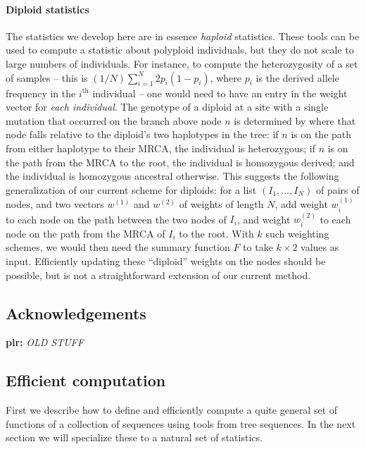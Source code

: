 \documentclass{article}
\newcommand{\plr}[1]{{\color{blue}\textbf{plr:} \it #1}}
\begin{document}
\paragraph{Diploid statistics}
The statistics we develop here are in essence \emph{haploid} statistics.
These tools can be used to compute a statistic about polyploid individuals,
but they do not scale to large numbers of individuals.
For instance, to compute the heterozygosity of a set of samples
-- this is $(1/N) \sum_{i=1}^N 2 p_i (1-p_i)$, where $p_i$ is the derived allele frequency
in the $i^\text{th}$ individual --
one would need to have an entry in the weight vector for \emph{each individual}.
The genotype of a diploid at a site with a single mutation that occurred on the branch above node $n$
is determined by where that node falls relative to the diploid's two haplotypes in the tree:
if $n$ is on the path from either haplotype to their MRCA, the individual is heterozygous;
if $n$ is on the path from the MRCA to the root, the individual is homozygous derived;
and the individual is homozygous ancestral otherwise.
This suggests the following generalization of our current scheme for diploids:
for a list $(I_1, \ldots, I_N)$ of pairs of nodes,
and two vectors $w^{(1)}$ and $w^{(2)}$ of weights of length $N$,
add weight $w^{(1)}_i$ to each node on the path between the two nodes of $I_i$,
and weight $w^{(2)}_i$ to each node on the path from the MRCA of $I_i$ to the root.
With $k$ such weighting schemes, we would then need the summary function $F$
to take $k \times 2$ values as input.
Efficiently updating these ``diploid'' weights on the nodes should be possible,
but is not a straightforward extension of our current method.




\subsection*{Acknowledgements}




\newpage
\appendix

{\Large \plr{OLD STUFF}}

\subsection*{Efficient computation}

First we describe how to define
and efficiently compute a quite general set of functions of a collection of sequences
using tools from tree sequences.
In the next section we will specialize these to a natural set of statistics.
\end{document}
